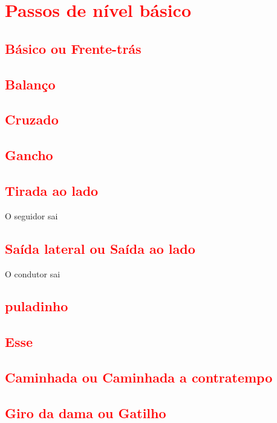 

\chapter{\textcolor{red}{Passos de nível básico}}


\section{\textcolor{red}{Básico ou Frente-trás}}

\section{\textcolor{red}{Balanço}}

\section{\textcolor{red}{Cruzado}}

\section{\textcolor{red}{Gancho}}

\section{\textcolor{red}{Tirada ao lado}}
O seguidor sai

\section{\textcolor{red}{Saída lateral ou Saída ao lado}}
O condutor sai

\section{\textcolor{red}{puladinho}}

\section{\textcolor{red}{Esse}}

\section{\textcolor{red}{Caminhada ou Caminhada a contratempo}}

\section{\textcolor{red}{Giro da dama ou Gatilho}}


